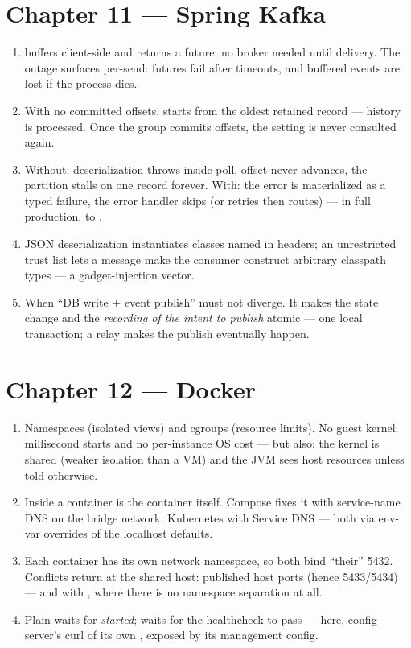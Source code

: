 \section*{Chapter 11 --- Spring Kafka}
\begin{enumerate}
  \item {} buffers client-side and returns a future; no
  broker needed until delivery. The outage surfaces per-send: futures
  fail after timeouts, and buffered events are lost if the process
  dies.
  \item With no committed offsets,  starts from the
  oldest retained record --- history is processed. Once the group
  commits offsets, the setting is never consulted again.
  \item Without: deserialization throws inside poll, offset never
  advances, the partition stalls on one record forever. With: the
  error is materialized as a typed failure, the error handler skips
  (or retries then routes) --- in full production, to
  .
  \item JSON deserialization instantiates classes named in headers; an
  unrestricted trust list lets a message make the consumer construct
  arbitrary classpath types --- a gadget-injection vector.
  \item When ``DB write + event publish'' must not diverge. It makes
  the state change and the \emph{recording of the intent to publish}
  atomic --- one local transaction; a relay makes the publish
  eventually happen.
\end{enumerate}

\section*{Chapter 12 --- Docker}
\begin{enumerate}
  \item Namespaces (isolated views) and cgroups (resource limits).
  No guest kernel: millisecond starts and no per-instance OS cost ---
  but also: the kernel is shared (weaker isolation than a VM) and the
  JVM sees host resources unless told otherwise.
  \item Inside a container  is the container itself.
  Compose fixes it with service-name DNS on the bridge network;
  Kubernetes with Service DNS --- both via env-var overrides of the
  localhost defaults.
  \item Each container has its own network namespace, so both bind
  ``their'' 5432. Conflicts return at the shared host: published
  host ports (hence 5433/5434) --- and with ,
  where there is no namespace separation at all.
  \item Plain  waits for \emph{started};
   waits for the healthcheck to pass ---
  here, config-server's curl of its own ,
  exposed by its management config.
\end{enumerate}

